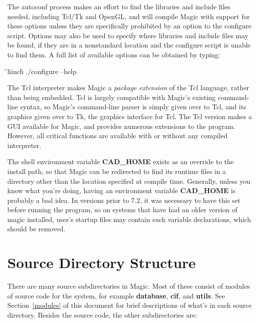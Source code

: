 \documentclass[letterpaper,twoside,12pt]{article}
\def\hinch{\hspace*{0.5in}}
\def\starti{\begin{center}\begin{tabbing}\hinch\=\hinch\=
	\hinch\=hinch\hinch\=\kill}
\def\endi{\end{tabbing}\end{center}}
\def\ii{\>\>\>}
\begin{document}
The autoconf process makes an effort to find the libraries and
include files needed, including Tcl/Tk and OpenGL, and will compile
Magic with support for these options unless they are specifically
prohibited by an option to the {\ttfamily configure} script.  Options
may also be used to specify where libraries and include files may
be found, if they are in a nonstandard location and the 
{\ttfamily configure} script is unable to find them.  A full list
of available options can be obtained by typing:

\starti
   \ii ./configure --help
\endi

The Tcl interpreter makes Magic a {\itshape package extension} of the
Tcl language, rather than being embedded.  Tcl is largely compatible
with Magic's existing command-line syntax, so Magic's command-line
parser is simply given over to Tcl, and its graphics given over to Tk,
the graphics interface for Tcl.  The Tcl version makes a GUI available
for Magic, and provides numerous extensions to the program.  However,
all critical functions are available with or without any compiled
interpreter.

The shell environment variable {\bfseries CAD{\_}HOME} exists as an
override to the install path, so that Magic can be redirected to find its
runtime files in a directory other than the location specified at
compile time.  Generally, unless you know what you're doing, having an
environment variable {\bfseries CAD{\_}HOME} is probably a bad idea.
In versions prior to 7.2, it was necessary to have this set before running
the program, so on systems that have had an older version of magic
installed, user's startup files may contain such variable declarations,
which should be removed.

\section{Source Directory Structure} \label{structure}

There are many source subdirectories in Magic.
Most of these consist of modules of source code for the system,
for example {\bfseries database}, {\bfseries cif}, and {\bfseries utils}.
See Section~\ref{modules} of this document for brief descriptions of
what's in each source directory.  Besides the source code,
the other subdirectories are:
\end{document}

